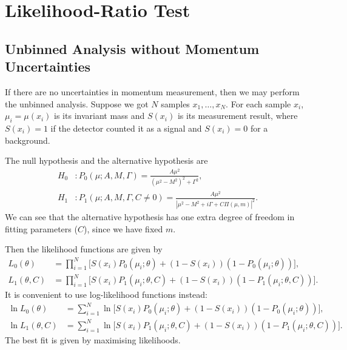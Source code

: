 \documentclass[10pt]{article}
\theoremstyle{definition}
\theoremstyle{remark}
\begin{document}
	\section{Likelihood-Ratio Test}
	\subsection{Unbinned Analysis without Momentum Uncertainties}
	If there are no uncertainties in momentum measurement, then we may perform the unbinned analysis.
	Suppose we got $N$ samples $x_{1},\dots,x_{N}$.
	For each sample $x_{i}$, $\mu_{i}=\mu(x_{i})$ is its invariant mass and $S(x_{i})$ is its measurement result, where $S(x_{i})=1$ if the detector counted it as a signal and $S(x_{i})=0$ for a background.
	
	The null hypothesis and the alternative hypothesis are
	\begin{align*}
		H_{0}&:P_{0}(\mu;A,M,\Gamma)=\frac{A\mu^{2}}{(\mu^{2}-M^{2})^{2}+\Gamma^{2}},\\
		H_{1}&:P_{1}(\mu;A,M,\Gamma,C\neq0)=\frac{A\mu^{2}}{|\mu^{2}-M^{2}+i\Gamma+C\Pi(\mu,m)|^{2}}.
	\end{align*}
	We can see that the alternative hypothesis has one extra degree of freedom in fitting parameters ($C$), since we have fixed $m$.
	
	Then the likelihood functions are given by
	\begin{align*}
		L_{0}(\theta)&=\prod_{i=1}^{N}\Big[S(x_{i})P_{0}(\mu_{i};\theta)+(1-S(x_{i}))(1-P_{0}(\mu_{i};\theta))\Big],\\
		L_{1}(\theta,C)&=\prod_{i=1}^{N}\Big[S(x_{i})P_{1}(\mu_{i};\theta,C)+(1-S(x_{i}))(1-P_{1}(\mu_{i};\theta,C))\Big].
	\end{align*}
	It is convenient to use log-likelihood functions instead:
	\begin{align*}
		\ln L_{0}(\theta)&=\sum_{i=1}^{N}\ln\Big[S(x_{i})P_{0}(\mu_{i};\theta)+(1-S(x_{i}))(1-P_{0}(\mu_{i};\theta))\Big],\\
		\ln L_{1}(\theta,C)&=\sum_{i=1}^{N}\ln\Big[S(x_{i})P_{1}(\mu_{i};\theta,C)+(1-S(x_{i}))(1-P_{1}(\mu_{i};\theta,C))\Big].
	\end{align*}
	The best fit is given by maximising likelihoods.
	
\end{document}
